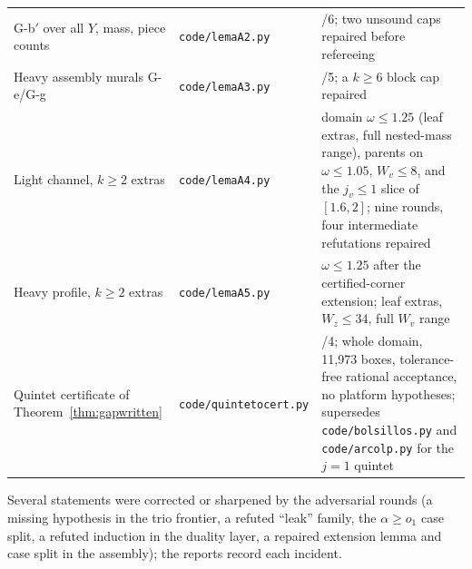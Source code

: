 \documentclass[11pt]{article}
\theoremstyle{definition}
\begin{document}
\begin{center}
\begin{longtable}{>{\raggedright\arraybackslash}p{}>{\raggedright\arraybackslash}p{}>{\raggedright\arraybackslash}p{}}
G-b$'$ over all $Y$, mass, piece counts & \texttt{code/lemaA2.py} & 6/6; two unsound caps repaired before refereeing \\
Heavy assembly murals G-e/G-g & \texttt{code/lemaA3.py} & 5/5; a $k\ge6$ block cap repaired \\
Light channel, $k\ge2$ extras & \texttt{code/lemaA4.py} & domain $\omega\le1.25$ (leaf extras, full nested-mass range), parents on $\omega\le1.05$, $W_v\le8$, and the $j_v\le1$ slice of $[1.6,2]$; nine rounds, four intermediate refutations repaired \\
Heavy profile, $k\ge2$ extras & \texttt{code/lemaA5.py} &
$\omega\le1.25$ after the certified-corner extension; leaf extras,
$W_z\le34$, full $W_v$ range \\
Quintet certificate of Theorem~\ref{thm:gapwritten} & \texttt{code/quintetocert.py} & 4/4; whole domain, 11{,}973 boxes, tolerance-free rational acceptance, no platform hypotheses; supersedes \texttt{code/bolsillos.py} and
\texttt{code/arcolp.py} for the $j=1$ quintet \\
\hline
\end{longtable}
\end{center}

Several statements were corrected or sharpened by the adversarial
rounds (a missing hypothesis in the trio frontier, a refuted
``leak'' family, the $\alpha\ge o_1$ case split, a refuted
induction in the duality layer, a repaired extension lemma and case
split in the assembly); the reports record each incident.
\end{document}
